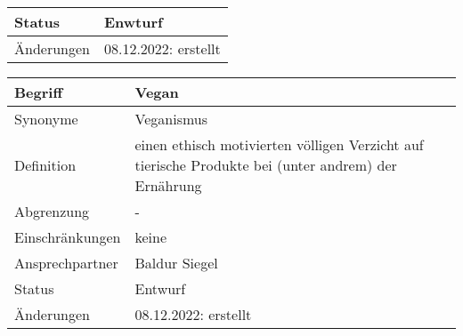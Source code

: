 \begin{table}[H]
\begin{tabularx}{\textwidth}{| l | X |}
        \hline
        Status          & Enwturf                                                                                                                                                                                                                                                                                                                                     \\
        \hline
        Änderungen      & 08.12.2022: erstellt                                                                                                                                                                                                                                                                                                                        \\
        \hline
    \end{tabularx}
\end{table}


\begin{table}[H]
    \centering
    \label{gls:vegan}
    \begin{tabularx}{\textwidth}{| l | X |}
        \hline
        Begriff         & Vegan                                                                                               \\
        \hline
        Synonyme        & Veganismus                                                                                          \\
        \hline
        Definition      & einen ethisch motivierten völligen Verzicht auf tierische Produkte bei (unter andrem) der Ernährung \\
        \hline
        Abgrenzung      & -                                                                                                   \\
        \hline
        Einschränkungen & keine                                                                                               \\
        \hline
        Ansprechpartner & Baldur Siegel                                                                                       \\
        \hline
        Status          & Entwurf                                                                                             \\
        \hline
        Änderungen      & 08.12.2022: erstellt                                                                                \\
        \hline
    \end{tabularx}
\end{table}

